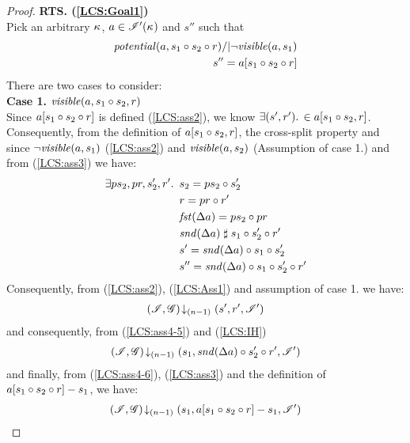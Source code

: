 \begin{lemma}
\begin{proof}
%
%
%
\noindent\textbf{RTS. (\ref{LCS:Goal1})}\\
Pick an arbitrary $\kappa_{}$, $a \in \mathscr{I}'(\kappa_{})$ and $s''$ such that 
\begin{align}
	\mathit{potential}(a, s_1 \circ s_2 \circ r) /| \neg\mathit{visible}(a, s_1) \label{LCS:ass2}\\
	s'' = a[s_1 \circ s_2 \circ r] \label{LCS:ass3}
\end{align}
%
There are two cases to consider:\\
\textbf{Case 1. }$\mathit{visible}(a, s_1 \circ s_2, r)$\\
Since $a[s_1 \circ s_2 \circ r]$ is defined (\ref{LCS:ass2}), we know $\exists (s', r').\, \in a[s_1 \circ s_2, r]$. Consequently, from the definition of $a[s_1 \circ s_2, r]$, the cross-split property and since $\neg\mathit{visible}(a, s_1)$ (\ref{LCS:ass2}) and $\mathit{visible}(a, s_2)$ (Assumption of case 1.) and from (\ref{LCS:ass3}) we have:
%
\begin{align}
	\exists ps_2, pr, s'_2, r'.\,\ & s_2 = ps_2 \circ s'_2 \label{LCS:ass4-1}\\
	& r = pr \circ r' \label{LCS:ass4-2}\\
	& \mathit{fst}(\Delta {a}) = ps_2 \circ pr \label{LCS:ass4-3}\\
	& \mathit{snd}(\Delta {a}) \mathrel{\sharp} s_1 \circ s'_2 \circ r'  \label{LCS:ass4-4}\\
	& s' = \mathit{snd}(\Delta {a}) \circ s_1 \circ  s'_2 \label{LCS:ass4-5}\\
	& s'' = \mathit{snd}(\Delta {a}) \circ s_1 \circ  s'_2 \circ r' \label{LCS:ass4-6}
\end{align}
% 
Consequently, from (\ref{LCS:ass2}), (\ref{LCS:Ass1}) and assumption of case 1. we have:
%
\begin{align*}
	\left(\mathscr{I}, \mathscr{G}\right) \!\downarrow_{(n-1)} \left(s', r', \mathscr{I}'\right)
\end{align*}
% 
and consequently, from (\ref{LCS:ass4-5}) and (\ref{LCS:IH})
%
\begin{align*}
	\left(\mathscr{I}, \mathscr{G}\right) \!\downarrow_{(n-1)} \left(s_1, \mathit{snd}(\Delta {a}) \circ  s'_2 \circ r', \mathscr{I}'\right)
\end{align*}
%
and finally, from (\ref{LCS:ass4-6}), (\ref{LCS:ass3}) and the definition of $a[s_1 \circ s_2 \circ r] - s_1$, we have:
%
\begin{align*}
	\left(\mathscr{I}, \mathscr{G}\right) \!\downarrow_{(n-1)} \left(s_1, a[s_1 \circ s_2 \circ r] - s_1, \mathscr{I}'\right)
\end{align*}

\end{proof}
\end{lemma}
